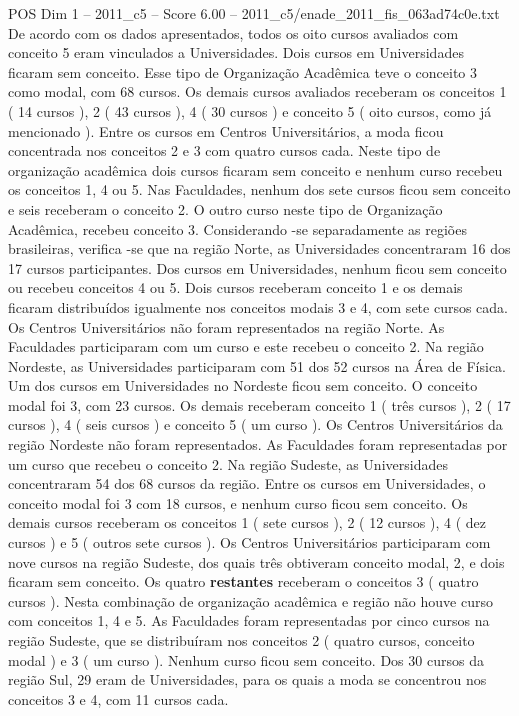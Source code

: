 \begin{textsample}{POS Dim 1 – 2011\_c5 – Score 6.00 – 2011\_c5/enade\_2011\_fis\_063ad74c0e.txt}
De acordo com os dados apresentados, todos os oito cursos avaliados com conceito 5 eram vinculados a Universidades.
Dois cursos em Universidades ficaram sem conceito.
Esse tipo de Organização Acadêmica teve o conceito 3 como modal, com 68 cursos.
Os demais cursos avaliados receberam os conceitos 1 ( 14 cursos ), 2 ( 43 cursos ), 4 ( 30 cursos ) e conceito 5 ( oito cursos, como já mencionado ).
Entre os cursos em Centros Universitários, a moda ficou concentrada nos conceitos 2 e 3 com quatro cursos cada.
Neste tipo de organização acadêmica dois cursos ficaram sem conceito e nenhum curso recebeu os conceitos 1, 4 ou 5.
Nas Faculdades, nenhum dos sete cursos ficou sem conceito e seis receberam o conceito 2.
O outro curso neste tipo de Organização Acadêmica, recebeu conceito 3.
Considerando -se separadamente as regiões brasileiras, verifica -se que na região Norte, as Universidades concentraram 16 dos 17 cursos participantes.
Dos cursos em Universidades, nenhum ficou sem conceito ou recebeu conceitos 4 ou 5.
Dois cursos receberam conceito 1 e os demais ficaram distribuídos igualmente nos conceitos modais 3 e 4, com sete cursos cada.
Os Centros Universitários não foram representados na região Norte.
As Faculdades participaram com um curso e este recebeu o conceito 2.
Na região Nordeste, as Universidades participaram com 51 dos 52 cursos na Área de Física.
Um dos cursos em Universidades no Nordeste ficou sem conceito.
O conceito modal foi 3, com 23 cursos.
Os demais receberam conceito 1 ( três cursos ), 2 ( 17 cursos ), 4 ( seis cursos ) e conceito 5 ( um curso ).
Os Centros Universitários da região Nordeste não foram representados.
As Faculdades foram representadas por um curso que recebeu o conceito 2.
Na região Sudeste, as Universidades concentraram 54 dos 68 cursos da região.
Entre os cursos em Universidades, o conceito modal foi 3 com 18 cursos, e nenhum curso ficou sem conceito.
Os demais cursos receberam os conceitos 1 ( sete cursos ), 2 ( 12 cursos ), 4 ( dez cursos ) e 5 ( outros sete cursos ).
Os Centros Universitários participaram com nove cursos na região Sudeste, dos quais três obtiveram conceito modal, 2, e dois ficaram sem conceito.
Os quatro \textbf{restantes} receberam o conceitos 3 ( quatro cursos ).
Nesta combinação de organização acadêmica e região não houve curso com conceitos 1, 4 e 5.
As Faculdades foram representadas por cinco cursos na região Sudeste, que se distribuíram nos conceitos 2 ( quatro cursos, conceito modal ) e 3 ( um curso ).
Nenhum curso ficou sem conceito.
Dos 30 cursos da região Sul, 29 eram de Universidades, para os quais a moda se concentrou nos conceitos 3 e 4, com 11 cursos cada.

\end{textsample}
